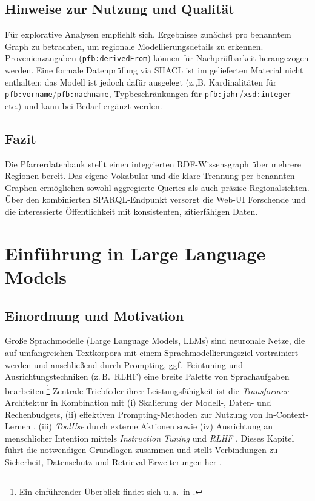 \subsection{Hinweise zur Nutzung und Qualität}
Für explorative Analysen empfiehlt sich, Ergebnisse zunächst pro benanntem Graph zu betrachten, um regionale Modellierungsdetails zu erkennen. Provenienzangaben (\texttt{pfb:derivedFrom}) können für Nachprüfbarkeit herangezogen werden. Eine formale Datenprüfung via SHACL ist im gelieferten Material nicht enthalten; das Modell ist jedoch dafür ausgelegt (z.,B. Kardinalitäten für \texttt{pfb:vorname}/\texttt{pfb:nachname}, Typbeschränkungen für \texttt{pfb:jahr}/\texttt{xsd:integer} etc.) und kann bei Bedarf ergänzt werden.

\subsection{Fazit}
Die Pfarrerdatenbank stellt einen integrierten RDF-Wissensgraph über mehrere Regionen bereit. Das eigene Vokabular und die klare Trennung per benannten Graphen ermöglichen sowohl aggregierte Queries als auch präzise Regionalsichten. Über den kombinierten SPARQL-Endpunkt versorgt die Web-UI Forschende und die interessierte Öffentlichkeit mit konsistenten, zitierfähigen Daten.








\section{Einführung in Large Language Models}
\label{sec:llm}

\subsection{Einordnung und Motivation}
Große Sprachmodelle (Large Language Models, LLMs) sind neuronale Netze, die auf umfangreichen Textkorpora mit einem Sprachmodellierungsziel vortrainiert werden und anschließend durch Prompting, ggf.\ Feintuning und Ausrichtungstechniken (z.\,B.\ RLHF) eine breite Palette von Sprachaufgaben bearbeiten.\footnote{Ein einführender Überblick findet sich u.\,a.\ in \cite{campesatoLLMIntro}.} 
Zentrale Triebfeder ihrer Leistungsfähigkeit ist die \emph{Transformer}-Architektur \cite{vaswani2017attention} in Kombination mit (i) Skalierung der Modell-, Daten- und Rechenbudgets, (ii) effektiven Prompting-Methoden zur Nutzung von In-Context-Lernen \cite{brown2020language,wei2022chain}, (iii) \emph{Tool\-Use} durch externe Aktionen \cite{yao2023react} sowie (iv) Ausrichtung an menschlicher Intention mittels \emph{Instruction Tuning} und \emph{RLHF} \cite{ouyang2022training}. 
Dieses Kapitel führt die notwendigen Grundlagen zusammen und stellt Verbindungen zu Sicherheit, Datenschutz und Retrieval-Erweiterungen her \cite{abadi2016deep,carlini2021extracting,lewis2020rag}. 

